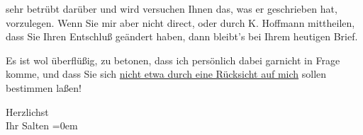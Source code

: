                sehr betrübt darüber und wird versuchen Ihnen das, was er geschrieben hat,
               vorzulegen. Wenn Sie mir aber nicht direct, oder durch K. Hoffmann mittheilen, dass Sie Ihren Entschluß geändert haben,
               dann bleibt’s bei Ihrem heutigen Brief.\pend
           
\pstart
           Es ist wol überflüßig, zu betonen, dass ich persönlich dabei garnicht in Frage komme,
               und dass Sie sich \uline{nicht etwa durch eine Rücksicht auf
                  mich} sollen bestimmen laßen!\pend
           
\pstart
           Herzlichst {\\[\baselineskip]}Ihr \spacefill\mbox{Salten}\pend
           \leftskip=0em{}\endnumbering{}  \newcommand{\dateiname}{L03406}\newcommand{\titel}{Felix Salten an Arthur Schnitzler, 20. 1. 1905}\newcommand{\editorInnen}{Martin Anton Müller und Laura Untner}
